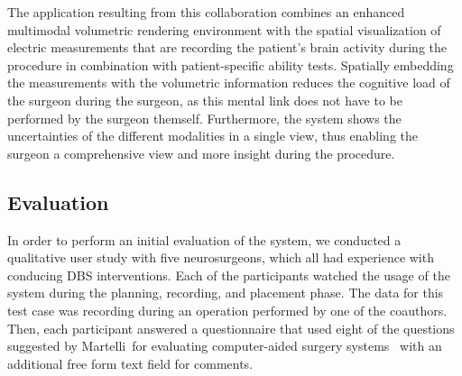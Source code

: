 The application resulting from this collaboration combines an enhanced multimodal  volumetric rendering environment with the spatial visualization of electric measurements that are recording the patient's brain activity during the procedure in combination with patient-specific ability tests. Spatially embedding the measurements with the volumetric information reduces the cognitive load of the surgeon during the surgeon, as this mental link does not have to be performed by the surgeon themself. Furthermore, the system shows the uncertainties of the different modalities in a single view, thus enabling the surgeon a comprehensive view and more insight during the procedure.


\subsection{Evaluation} \label{contributions:dbs:evaluation}
In order to perform an initial evaluation of the system, we conducted a qualitative user study with five neurosurgeons, which all had experience with conducing DBS interventions. Each of the participants watched the usage of the system during the planning, recording, and placement phase. The data for this test case was recording during an operation performed by one of the coauthors. Then, each participant answered a questionnaire that used eight of the questions suggested by Martelli~\etal for evaluating computer-aided surgery systems~\cite{martelli2003criteria} with an additional free form text field for comments.



